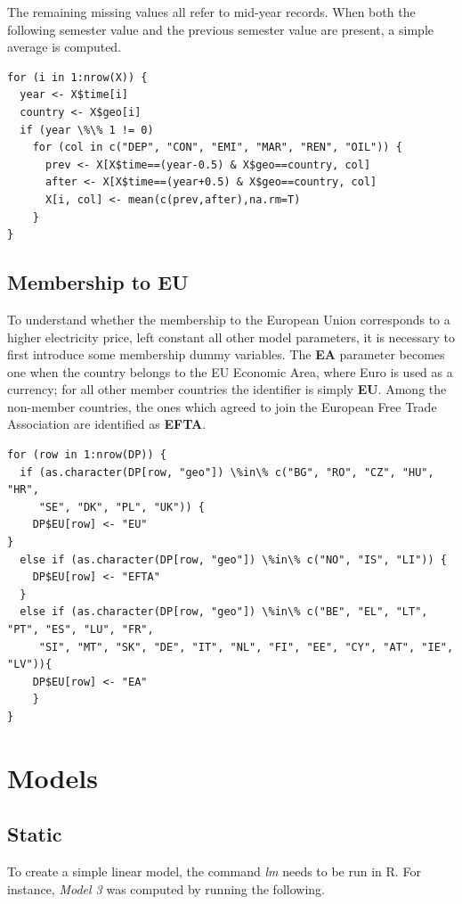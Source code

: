 \documentclass{book}
\begin{document}
\begin{appendices}
\noindent The remaining missing values all refer to mid-year records. When both the following semester value and the previous semester value are present, a simple average is computed.

\begin{verbatim}
for (i in 1:nrow(X)) {
  year <- X$time[i]
  country <- X$geo[i]
  if (year \%\% 1 != 0)
    for (col in c("DEP", "CON", "EMI", "MAR", "REN", "OIL")) {
      prev <- X[X$time==(year-0.5) & X$geo==country, col]
      after <- X[X$time==(year+0.5) & X$geo==country, col]
      X[i, col] <- mean(c(prev,after),na.rm=T)
    }
}
\end{verbatim}

\section*{Membership to EU}

To understand whether the membership to the European Union corresponds to a higher electricity price, left constant all other model parameters, it is necessary to first introduce some membership dummy variables. The \textbf{EA} parameter becomes one when the country belongs to the EU Economic Area, where Euro is used as a currency; for all other member countries the identifier is simply \textbf{EU}. Among the non-member countries, the ones which agreed to join the European Free Trade Association are identified as \textbf{EFTA}.

\begin{verbatim}
for (row in 1:nrow(DP)) {
  if (as.character(DP[row, "geo"]) \%in\% c("BG", "RO", "CZ", "HU", "HR",
	 "SE", "DK", "PL", "UK")) {
    DP$EU[row] <- "EU"
}
  else if (as.character(DP[row, "geo"]) \%in\% c("NO", "IS", "LI")) {
    DP$EU[row] <- "EFTA"
  }
  else if (as.character(DP[row, "geo"]) \%in\% c("BE", "EL", "LT", "PT", "ES", "LU", "FR",
	 "SI", "MT", "SK", "DE", "IT", "NL", "FI", "EE", "CY", "AT", "IE", "LV")){
    DP$EU[row] <- "EA"
    }
}
\end{verbatim}

\chapter*{Models}
\section*{Static}

To create a simple linear model, the command \textit{lm} needs to be run in R. For instance, \textit{Model 3} was computed by running the following.


\end{appendices}
\end{document}
